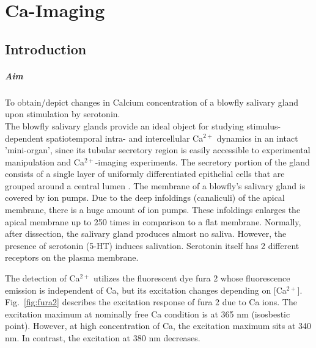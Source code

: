 
\chapter{Ca-Imaging}
\label{chp:Ca-Imaging}


\section{Introduction}

\paragraph{Aim} To obtain/depict changes in Calcium concentration of a blowfly salivary gland upon stimulation by serotonin.
\\

The blowfly salivary glands provide an ideal object for studying stimulus-dependent spatiotemporal intra- and intercellular Ca$^{2+}$ dynamics in an intact 'mini-organ', since its tubular secretory region is easily accessible to experimental manipulation and Ca$^{2+}$-imaging experiments. 
The secretory portion of the gland consists of a single layer of uniformly differentiated epithelial cells that are grouped around a central lumen \cite{Zimmermann1997}.
The membrane of a blowfly's salivary gland is covered by ion pumps. 
Due to the deep infoldings (canaliculi) of the apical membrane, there is a huge amount of ion pumps. These infoldings enlarges the apical membrane up to 250 times in comparison to a flat membrane. 
Normally, after dissection, the salivary gland produces almost no saliva. 
However, the presence of serotonin (5-HT) induces salivation. Serotonin itself has 2 different receptors on the plasma membrane. 

The detection of Ca$^{2+}$ utilizes the fluorescent dye fura 2 whose fluorescence emission is independent of Ca, but its excitation changes depending on [Ca$^{2+}$]. 
Fig.~\ref{fig:fura2} describes the excitation response of fura 2 due to Ca ions. 
The excitation maximum at nominally free Ca condition is at 365 nm (isosbestic point). However, at high concentration of Ca, the excitation maximum sits at 340 nm. 
In contrast, the excitation at 380 nm decreases. 

